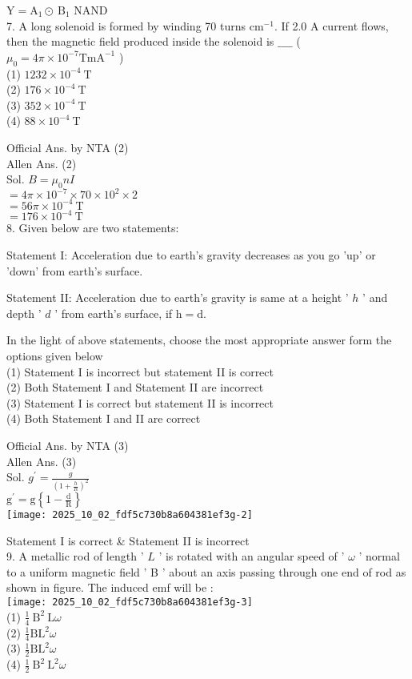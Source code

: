 \documentclass[10pt]{article}
\begin{document}
\(\mathrm{Y}=\mathrm{A}_{1} \odot \mathrm{~B}_{1}\) NAND\\
7. A long solenoid is formed by winding 70 turns \(\mathrm{cm}^{-1}\). If 2.0 A current flows, then the magnetic field produced inside the solenoid is \(\_\_\_\_\) ( \(\mu_{0}=4 \pi \times 10^{-7} \mathrm{TmA}^{-1}\) )\\
(1) \(1232 \times 10^{-4} \mathrm{~T}\)\\
(2) \(176 \times 10^{-4} \mathrm{~T}\)\\
(3) \(352 \times 10^{-4} \mathrm{~T}\)\\
(4) \(88 \times 10^{-4} \mathrm{~T}\)

Official Ans. by NTA (2)\\
Allen Ans. (2)\\
Sol. \(B=\mu_{0} n I\)\\
\(=4 \pi \times 10^{-7} \times 70 \times 10^{2} \times 2\)\\
\(=56 \pi \times 10^{-4} \mathrm{~T}\)\\
\(=176 \times 10^{-4} \mathrm{~T}\)\\
8. Given below are two statements:

Statement I: Acceleration due to earth's gravity decreases as you go 'up' or 'down' from earth's surface.

Statement II: Acceleration due to earth's gravity is same at a height ' \(h\) ' and depth ' \(d\) ' from earth's surface, if \(\mathrm{h}=\mathrm{d}\).

In the light of above statements, choose the most appropriate answer form the options given below\\
(1) Statement I is incorrect but statement II is correct\\
(2) Both Statement I and Statement II are incorrect\\
(3) Statement I is correct but statement II is incorrect\\
(4) Both Statement I and II are correct

Official Ans. by NTA (3)\\
Allen Ans. (3)\\
Sol. \(g^{\prime}=\frac{g}{\left(1+\frac{h}{R}\right)^{2}}\)\\
\(\mathrm{g}^{\prime}=\mathrm{g}\left\{1-\frac{\mathrm{d}}{\mathrm{R}}\right\}\)\\
\texttt{[image: 2025\_10\_02\_fdf5c730b8a604381ef3g-2]}

Statement I is correct \& Statement II is incorrect\\
9. A metallic rod of length ' \(L\) ' is rotated with an angular speed of ' \(\omega\) ' normal to a uniform magnetic field ' B ' about an axis passing through one end of rod as shown in figure. The induced emf will be :\\
\texttt{[image: 2025\_10\_02\_fdf5c730b8a604381ef3g-3]}\\
(1) \(\frac{1}{4} \mathrm{~B}^{2} \mathrm{~L} \omega\)\\
(2) \(\frac{1}{4} \mathrm{BL}^{2} \omega\)\\
(3) \(\frac{1}{2} \mathrm{BL}^{2} \omega\)\\
(4) \(\frac{1}{2} \mathrm{~B}^{2} \mathrm{~L}^{2} \omega\)
\end{document}
